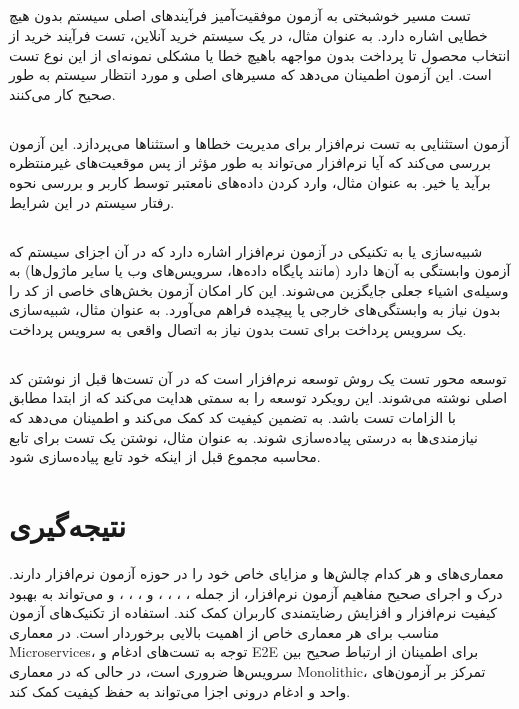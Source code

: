 \subsection*{}
تست مسیر خوشبختی
به آزمون موفقیت‌آمیز فرآیندهای اصلی سیستم بدون هیچ خطایی اشاره دارد. به عنوان مثال، در یک سیستم خرید آنلاین، تست فرآیند خرید از انتخاب محصول تا پرداخت بدون مواجهه باهیچ خطا یا مشکلی نمونه‌ای از این نوع تست است. این آزمون اطمینان می‌دهد که مسیرهای اصلی و مورد انتظار سیستم به طور صحیح کار می‌کنند.

\subsection*{}
آزمون استثنایی
 به تست نرم‌افزار برای مدیریت خطاها و استثناها می‌پردازد. این آزمون بررسی می‌کند که آیا نرم‌افزار می‌تواند به طور مؤثر از پس موقعیت‌های غیرمنتظره برآید یا خیر. به عنوان مثال، وارد کردن داده‌های نامعتبر توسط کاربر و بررسی نحوه رفتار سیستم در این شرایط.

\subsection*{}
شبیه‌سازی یا 
به تکنیکی در آزمون نرم‌افزار اشاره دارد که در آن اجزای سیستم که آزمون وابستگی به آن‌ها دارد (مانند پایگاه داده‌ها، سرویس‌های وب یا سایر ماژول‌ها) به وسیله‌ی اشیاء جعلی
جایگزین می‌شوند. این کار امکان آزمون بخش‌های خاصی از کد را بدون نیاز به وابستگی‌های خارجی یا پیچیده فراهم می‌آورد. به عنوان مثال، شبیه‌سازی یک سرویس پرداخت برای تست بدون نیاز به اتصال واقعی به سرویس پرداخت.

\subsection*{}
توسعه محور تست
 یک روش توسعه نرم‌افزار است که در آن تست‌ها قبل از نوشتن کد اصلی نوشته می‌شوند. این رویکرد توسعه را به سمتی هدایت می‌کند که از ابتدا مطابق با الزامات تست باشد.
 به تضمین کیفیت کد کمک می‌کند و اطمینان می‌دهد که نیازمندی‌ها به درستی پیاده‌سازی شوند. به عنوان مثال، نوشتن یک تست برای تابع محاسبه مجموع قبل از اینکه خود تابع پیاده‌سازی شود.

\section*{نتیجه‌گیری}
معماری‌های
و
هر کدام چالش‌ها و مزایای خاص خود را در حوزه آزمون نرم‌افزار دارند. درک و اجرای صحیح مفاهیم آزمون نرم‌افزار، از جمله
،
،
،
،
و
،
،
،
و 
می‌تواند به بهبود کیفیت نرم‌افزار و افزایش رضایتمندی کاربران کمک کند. استفاده از تکنیک‌های آزمون مناسب برای هر معماری خاص از اهمیت بالایی برخوردار است. در معماری Microservices، توجه به تست‌های ادغام و E2E برای اطمینان از ارتباط صحیح بین سرویس‌ها ضروری است، در حالی که در معماری Monolithic، تمرکز بر آزمون‌های واحد و ادغام درونی اجزا می‌تواند به حفظ کیفیت کمک کند.

